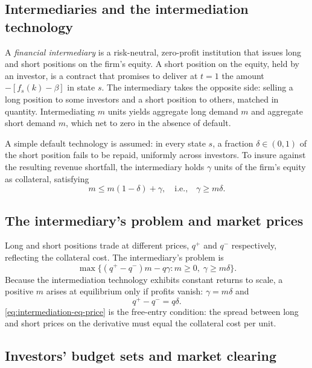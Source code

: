 \documentclass[11pt,a4paper,oneside]{book}
\def\leq{\leqslant}
\def\geq{\geqslant}
\theoremstyle{plain}
\theoremstyle{definition}
\theoremstyle{remark}
\numberwithin{equation}{chapter}
\begin{document}
\subsection{Intermediaries and the intermediation technology}

A \emph{financial intermediary} is a risk-neutral, zero-profit institution that issues long and short positions on the firm's equity.
A short position on the equity, held by an investor, is a contract that promises to deliver at $t=1$ the amount $-[f_s(k) - \beta]$ in state $s$.
The intermediary takes the opposite side: selling a long position to some investors and a short position to others, matched in quantity.
Intermediating $m$ units yields aggregate long demand $m$ and aggregate short demand $m$, which net to zero in the absence of default.

A simple default technology is assumed: in every state $s$, a fraction $\delta \in (0, 1)$ of the short position fails to be repaid, uniformly across investors.
To insure against the resulting revenue shortfall, the intermediary holds $\gamma$ units of the firm's equity as collateral, satisfying
\begin{equation}\label{eq:collateral}
  m \leq m(1 - \delta) + \gamma,
  \quad \text{i.e.,} \quad
  \gamma \geq m \delta.
\end{equation}

\subsection{The intermediary's problem and market prices}

Long and short positions trade at different prices, $q^+$ and $q^-$ respectively, reflecting the collateral cost.
The intermediary's problem is
\begin{equation}\label{eq:intermediary}
  \max \bigl\{ (q^+ - q^-) m - q \gamma \colon m \geq 0, \; \gamma \geq m \delta \bigr\}.
\end{equation}
Because the intermediation technology exhibits constant returns to scale, a positive $m$ arises at equilibrium only if profits vanish: $\gamma = m \delta$ and
\begin{equation}\label{eq:intermediation-eq-price}
  q^+ - q^- = q \delta.
\end{equation}
\eqref{eq:intermediation-eq-price} is the free-entry condition: the spread between long and short prices on the derivative must equal the collateral cost per unit.

\subsection{Investors' budget sets and market clearing}
\end{document}
